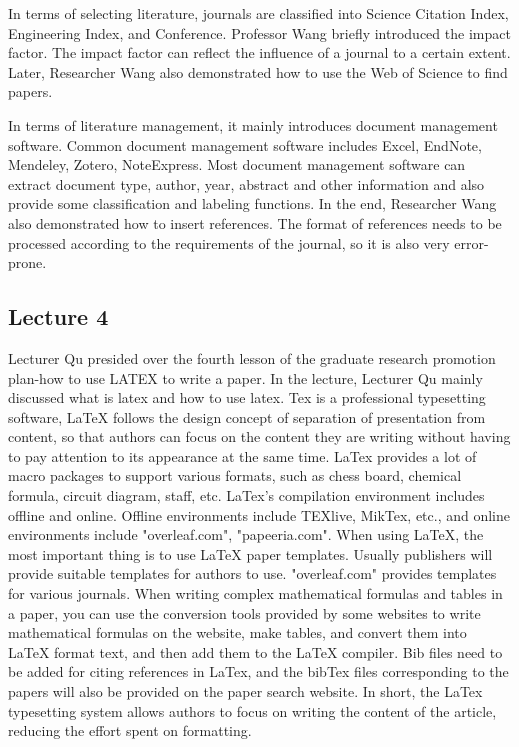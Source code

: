 \documentclass[UTF-8]{ctexart}
\begin{document}
In terms of selecting literature, journals are classified into Science Citation Index, Engineering Index, and Conference. Professor Wang briefly introduced the impact factor. The impact factor can reflect the influence of a journal to a certain extent. Later, Researcher Wang also demonstrated how to use the Web of Science to find papers.

In terms of literature management, it mainly introduces document management software. Common document management software includes Excel, EndNote, Mendeley, Zotero, NoteExpress. Most document management software can extract document type, author, year, abstract and other information and also provide some classification and labeling functions. In the end, Researcher Wang also demonstrated how to insert references. The format of references needs to be processed according to the requirements of the journal, so it is also very error-prone.

\subsection{Lecture 4} 
Lecturer Qu presided over the fourth lesson of the graduate research promotion plan-how to use LATEX to write a paper. In the lecture, Lecturer Qu mainly discussed what is latex and how to use latex.
Tex is a professional typesetting software, LaTeX follows the design concept of separation of presentation from content, so that authors can focus on the content they are writing without having to pay attention to its appearance at the same time. LaTex provides a lot of macro packages to support various formats, such as chess board, chemical formula, circuit diagram, staff, etc. LaTex's compilation environment includes offline and online. Offline environments include TEXlive, MikTex, etc., and online environments include "overleaf.com", "papeeria.com".
When using LaTeX, the most important thing is to use LaTeX paper templates. Usually publishers will provide suitable templates for authors to use. "overleaf.com" provides templates for various journals. When writing complex mathematical formulas and tables in a paper, you can use the conversion tools provided by some websites to write mathematical formulas on the website, make tables, and convert them into LaTeX format text, and then add them to the LaTeX compiler. Bib files need to be added for citing references in LaTex, and the bibTex files corresponding to the papers will also be provided on the paper search website.
In short, the LaTex typesetting system allows authors to focus on writing the content of the article, reducing the effort spent on formatting.
\end{document}
